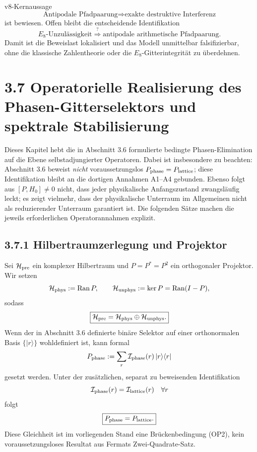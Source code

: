 \documentclass[11pt,a4paper]{article}
\begin{document}
\begin{statusbox}{v8-Kernaussage}
\[
\boxed{
\text{Antipodale Pfadpaarung}
\Longrightarrow
\text{exakte destruktive Interferenz}
}
\]
ist bewiesen. Offen bleibt die entscheidende Identifikation
\[
\boxed{
\text{$E_8$-Unzulässigkeit}
\stackrel{?}{\Longrightarrow}
\text{antipodale arithmetische Pfadpaarung}.
}
\]
Damit ist die Beweislast lokalisiert und das Modell unmittelbar falsifizierbar, ohne die klassische Zahlentheorie oder die $E_8$-Gitterintegrität zu überdehnen.
\end{statusbox}


\newpage
\section*{3.7 Operatorielle Realisierung des Phasen-Gitterselektors und spektrale Stabilisierung}

\begin{warningbox}
Dieses Kapitel hebt die in Abschnitt 3.6 formulierte bedingte Phasen-Elimination auf die Ebene selbstadjungierter Operatoren. Dabei ist insbesondere zu beachten: Abschnitt 3.6 beweist \emph{nicht} voraussetzungslos $P_{\rm phase}=P_{\rm lattice}$; diese Identifikation bleibt an die dortigen Annahmen A1--A4 gebunden. Ebenso folgt aus $[P,H_0]\neq0$ nicht, dass jeder physikalische Anfangszustand zwangsläufig leckt; es zeigt vielmehr, dass der physikalische Unterraum im Allgemeinen nicht als reduzierender Unterraum garantiert ist. Die folgenden Sätze machen die jeweils erforderlichen Operatorannahmen explizit.
\end{warningbox}

\subsection*{3.7.1 Hilbertraumzerlegung und Projektor}
Sei $\mathcal H_{\rm pre}$ ein komplexer Hilbertraum und $P=P^*=P^2$ ein orthogonaler Projektor. Wir setzen
\[
\mathcal H_{\rm phys}:=\operatorname{Ran}P,
\qquad
\mathcal H_{\rm unphys}:=\ker P=\operatorname{Ran}(I-P),
\]
sodass
\[
\boxed{\mathcal H_{\rm pre}=\mathcal H_{\rm phys}\oplus\mathcal H_{\rm unphys}.}
\]
Wenn der in Abschnitt 3.6 definierte binäre Selektor auf einer orthonormalen Basis $\{|r\rangle\}$ wohldefiniert ist, kann formal
\[
P_{\rm phase}:=\sum_r \mathcal I_{\rm phase}(r)\,|r\rangle\langle r|
\]
gesetzt werden. Unter der zusätzlichen, separat zu beweisenden Identifikation
\[
\mathcal I_{\rm phase}(r)=\mathcal I_{\rm lattice}(r)\quad\forall r
\]
folgt
\[
\boxed{P_{\rm phase}=P_{\rm lattice}.}
\]
Diese Gleichheit ist im vorliegenden Stand eine Brückenbedingung (OP2), kein voraussetzungsloses Resultat aus Fermats Zwei-Quadrate-Satz.
\end{document}
